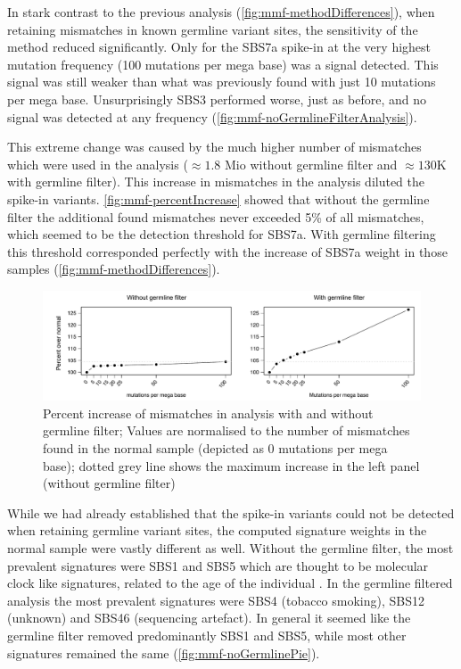 In stark contrast to the previous analysis (\autoref{fig:mmf-methodDifferences}), when retaining mismatches in known germline variant sites, the sensitivity of the method reduced significantly. Only for the SBS7a spike-in at the very highest mutation frequency (100 mutations per mega base) was a signal detected. This signal was still weaker than what was previously found with just 10 mutations per mega base. Unsurprisingly SBS3 performed worse, just as before, and no signal was detected at any frequency (\autoref{fig:mmf-noGermlineFilterAnalysis}).

This extreme change was caused by the much higher number of mismatches which were used in the analysis ($\approx 1.8$ Mio without germline filter and $\approx 130$K with germline filter).
This increase in mismatches in the analysis diluted the spike-in variants. \autoref{fig:mmf-percentIncrease} showed that without the germline filter the additional found mismatches never exceeded 5\% of all mismatches, which seemed to be the detection threshold for SBS7a. With germline filtering this threshold corresponded perfectly with the increase of SBS7a weight in those samples (\autoref{fig:mmf-methodDifferences}).

\begin{figure}[ht]
\centering
\includegraphics[width=.99\linewidth]{Figures/MisMatchFinder/spikeInPercentage.pdf}
\caption[Percent increase of mismatches in analysis with and without germline filter]{Percent increase of mismatches in analysis with and without germline filter; Values are normalised to the number of mismatches found in the normal sample (depicted as \num{0} mutations per mega base); dotted grey line shows the maximum increase in the left panel (without germline filter)}\label{fig:mmf-percentIncrease}
\end{figure}

While we had already established that the spike-in variants could not  be detected when retaining germline variant sites, the computed signature weights in the normal sample were vastly different as well. Without the germline filter, the most prevalent signatures were SBS1 and SBS5 which are thought to be molecular clock like signatures, related to the age of the individual \cite{Alexandrov2020}. In the germline filtered analysis the most prevalent signatures were SBS4 (tobacco smoking), SBS12 (unknown) and SBS46 (sequencing artefact). In general it seemed like the germline filter removed predominantly SBS1 and SBS5, while most other signatures remained the same (\autoref{fig:mmf-noGermlinePie}).

